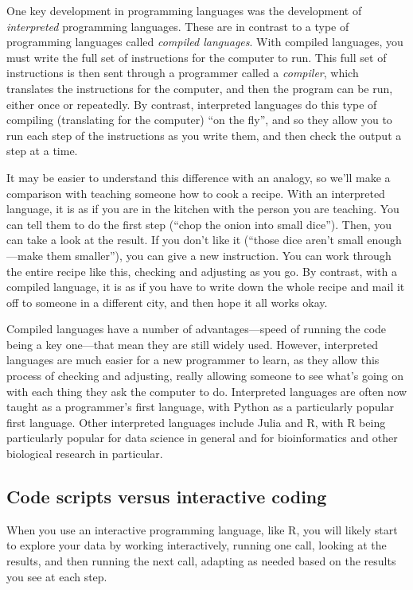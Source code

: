 \documentclass[]{tufte-book}
\begin{document}
One key development in programming languages was the development of
\emph{interpreted} programming languages. These are in contrast to a type of
programming languages called \emph{compiled languages}. With compiled languages,
you must write the full set of instructions for the computer to run. This
full set of instructions is then sent through a programmer called a \emph{compiler},
which translates the instructions for the computer, and then the program can
be run, either once or repeatedly. By contrast, interpreted languages do this
type of compiling (translating for the computer) ``on the fly'', and so they
allow you to run each step of the instructions as you write them, and then
check the output a step at a time.

It may be easier to understand this difference with an analogy, so we'll make a
comparison with teaching someone how to cook a recipe. With an interpreted
language, it is as if you are in the kitchen with the person you are teaching.
You can tell them to do the first step (``chop the onion into small dice'').
Then, you can take a look at the result. If you don't like it (``those dice aren't
small enough---make them smaller''), you can give a new instruction. You can
work through the entire recipe like this, checking and adjusting as you go.
By contrast, with a compiled language, it is as if you have to write down the
whole recipe and mail it off to someone in a different city, and then hope it
all works okay.

Compiled languages have a number of advantages---speed of running the code
being a key one---that mean they are still widely used. However, interpreted
languages are much easier for a new programmer to learn, as they allow this
process of checking and adjusting, really allowing someone to see what's going
on with each thing they ask the computer to do. Interpreted languages are
often now taught as a programmer's first language, with Python as a particularly
popular first language. Other interpreted languages include Julia and R, with
R being particularly popular for data science in general and for bioinformatics
and other biological research in particular.

\hypertarget{code-scripts-versus-interactive-coding}{%
\subsection{Code scripts versus interactive coding}\label{code-scripts-versus-interactive-coding}}

When you use an interactive programming language, like R, you will likely
start to explore your data by working interactively, running one call, looking
at the results, and then running the next call, adapting as needed based on the
results you see at each step.
\end{document}

